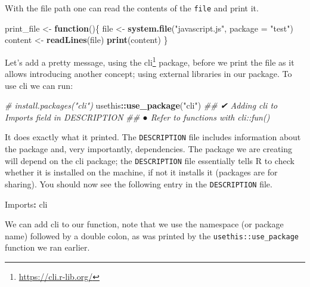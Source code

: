\documentclass[
]{krantz}
\makeatletter
\newenvironment{Shaded}{\begin{snugshade}}{\end{snugshade}}
\newcommand{\CommentTok}[1]{\textcolor[rgb]{0.37,0.37,0.37}{\textit{#1}}}
\newcommand{\ControlFlowTok}[1]{\textcolor[rgb]{0.27,0.27,0.27}{\textbf{#1}}}
\newcommand{\DataTypeTok}[1]{\textcolor[rgb]{0.27,0.27,0.27}{#1}}
\newcommand{\KeywordTok}[1]{\textcolor[rgb]{0.27,0.27,0.27}{\textbf{#1}}}
\newcommand{\NormalTok}[1]{#1}
\newcommand{\OperatorTok}[1]{\textcolor[rgb]{0.43,0.43,0.43}{\textbf{#1}}}
\newcommand{\StringTok}[1]{\textcolor[rgb]{0.5,0.5,0.5}{#1}}
\renewcommand{\href}[2]{#2\footnote{\url{#1}}}
\newenvironment{kframe}{%
\medskip{}
\setlength{\fboxsep}{.8em}
 \def\at@end@of@kframe{}%
 \ifinner\ifhmode%
  \def\at@end@of@kframe{\end{minipage}}%
  \begin{minipage}{\columnwidth}%
 \fi\fi%
 \def\FrameCommand##1{\hskip\@totalleftmargin \hskip-\fboxsep
 \colorbox{shadecolor}{##1}\hskip-\fboxsep
     \hskip-\linewidth \hskip-\@totalleftmargin \hskip\columnwidth}%
 \MakeFramed {\advance\hsize-\width
   \@totalleftmargin\z@ \linewidth\hsize
   \@setminipage}}%
 {\par\unskip\endMakeFramed%
 \at@end@of@kframe}
\renewenvironment{Shaded}{\begin{kframe}}{\end{kframe}}
\makeatother
\begin{document}
With the file path one can read the contents of the \texttt{file} and print it.

\begin{Shaded}
\begin{Highlighting}[]
\NormalTok{print\_file <{-}}\StringTok{ }\ControlFlowTok{function}\NormalTok{()\{}
\NormalTok{  file <{-}}\StringTok{ }\KeywordTok{system.file}\NormalTok{(}\StringTok{"javascript.js"}\NormalTok{, }\DataTypeTok{package =} \StringTok{"test"}\NormalTok{)}
\NormalTok{  content <{-}}\StringTok{ }\KeywordTok{readLines}\NormalTok{(file)}
  \KeywordTok{print}\NormalTok{(content)}
\NormalTok{\}}
\end{Highlighting}
\end{Shaded}

Let's add a pretty message, using the \href{https://cli.r-lib.org/}{cli} \citep{R-cli} package, before we print the file as it allows introducing another concept; using external libraries in our package. To use cli we can run:

\begin{Shaded}
\begin{Highlighting}[]
\CommentTok{\# install.packages("cli")}
\NormalTok{usethis}\OperatorTok{::}\KeywordTok{use\_package}\NormalTok{(}\StringTok{"cli"}\NormalTok{)}
\CommentTok{\#\# ✔ Adding \textquotesingle{}cli\textquotesingle{} to Imports field in DESCRIPTION}
\CommentTok{\#\# ● Refer to functions with \textasciigrave{}cli::fun()\textasciigrave{}}
\end{Highlighting}
\end{Shaded}

It does exactly what it printed. The \texttt{DESCRIPTION} file includes information about the package and, very importantly, dependencies. The package we are creating will depend on the cli package; the \texttt{DESCRIPTION} file essentially tells R to check whether it is installed on the machine, if not it installs it (packages are for sharing). You should now see the following entry in the \texttt{DESCRIPTION} file.

\begin{Shaded}
\begin{Highlighting}[]
\NormalTok{Imports}\OperatorTok{:}\StringTok{ }
\StringTok{    }\NormalTok{cli}
\end{Highlighting}
\end{Shaded}

We can add cli to our function, note that we use the namespace (or package name) followed by a double colon, as was printed by the \texttt{usethis::use\_package} function we ran earlier.
\end{document}
